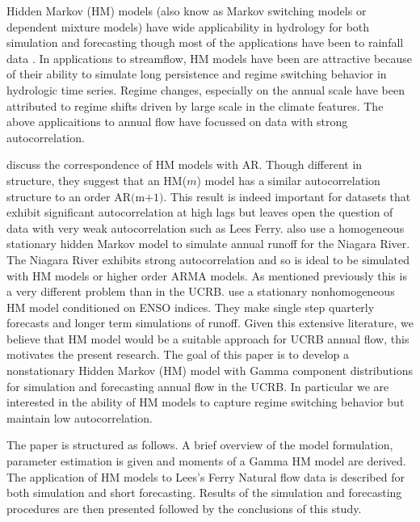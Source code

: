 \documentclass[wrr]{AGUTeX}
\begin{document}
\begin{article}
Hidden Markov (HM) models (also know as Markov switching models or dependent mixture models) have wide applicability in hydrology for both simulation and forecasting though most of the applications have been to rainfall data \citep{Jackson:1975gn,Zucchini:1991tk,Thyer:2000ud,Mehrotra:2005ts}.  In applications to streamflow, HM models have been \citep{Zucchini:1991tk,Akntug:2005wx,Gelati:2010wk} are attractive because of their ability to simulate long persistence and regime switching behavior in hydrologic time series.  Regime changes, especially on the annual scale have been attributed to regime shifts driven by large scale in the climate features.  The above applicaitions to annual flow have focussed on data with strong autocorrelation.

\cite{Akntug:2005wx} discuss the correspondence of HM models with AR.  Though different in structure, they suggest that an HM($m$) model has a similar autocorrelation structure to an order $\mbox{AR(m+1)}$.  This result is indeed important for datasets that exhibit
significant autocorrelation at high lags but leaves open the question of data with very weak autocorrelation such as Lees Ferry.  \cite{Akntug:2005wx} also use a homogeneous stationary hidden Markov model to simulate annual runoff for the Niagara River. The Niagara River exhibits strong autocorrelation and so is ideal to be simulated with HM models or higher order ARMA models.  As mentioned previously this is a very different problem than in the UCRB. \cite{Gelati:2010wk} use a stationary nonhomogeneous HM model conditioned on ENSO indices. They make single step quarterly forecasts and longer term simulations of runoff. Given this extensive literature, we believe that HM model would be a suitable approach for UCRB annual flow, this motivates the present research. The goal of this paper is to develop a nonstationary Hidden Markov (HM) model with Gamma component distributions for simulation and forecasting annual flow in the UCRB. In particular we are interested in the ability of HM models to capture regime switching behavior but maintain low autocorrelation.

The paper is structured as follows. A brief overview of the model formulation, parameter estimation is given and moments of a Gamma HM model are derived. The application of HM models to Lees's Ferry Natural flow data is described for both simulation and short forecasting.  Results of the simulation and forecasting procedures are then presented followed by the conclusions of this study.


\end{article}
\end{document}
